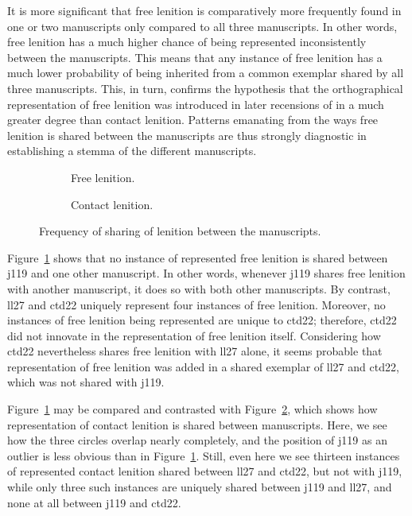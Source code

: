 It is more significant that free lenition is comparatively more frequently found in one or two manuscripts only compared to all three manuscripts. In other words, free lenition has a much higher chance of being represented inconsistently between the manuscripts. This means that any instance of free lenition has a much lower probability of being inherited from a common exemplar shared by all three manuscripts. This, in turn, confirms the hypothesis that the orthographical representation of free lenition was introduced in later recensions of  in a much greater degree than contact lenition. Patterns  emanating from the ways free lenition is shared between the manuscripts are thus strongly diagnostic in establishing a stemma of the different manuscripts.

\begin{figure}[h]
  \begin{subfigure}[b]{0.5\linewidth}
    \centering
    
    \caption{Free lenition.}
    \label{fig:vennfreelendewi}
  \end{subfigure}%
  \begin{subfigure}[b]{0.5\linewidth}
    \centering
    
    \caption{Contact lenition.}
    \label{fig:venncontlendewi}
  \end{subfigure}
  \caption{Frequency of sharing of lenition between  the manuscripts.}
  \label{fig:vennlendewi}
\end{figure}
Figure~\ref{fig:vennfreelendewi} shows that no instance of represented free lenition  is shared between \gls{j119} and one other manuscript. In other words, whenever \gls{j119} shares free lenition with another manuscript, it does so with both other manuscripts. By contrast, \gls{ll27} and \gls{ctd22} uniquely represent four instances of free lenition. Moreover, no instances of free lenition being represented are unique to \gls{ctd22}; therefore, \gls{ctd22} did not innovate in the representation of free lenition itself. Considering how \gls{ctd22} nevertheless shares free lenition with \gls{ll27} alone, it seems probable that representation of free lenition was added in a shared exemplar of \gls{ll27} and \gls{ctd22}, which was not shared with \gls{j119}.


Figure~\ref{fig:vennfreelendewi} may be compared and contrasted with Figure~\ref{fig:venncontlendewi}, which shows how representation of contact lenition is shared between manuscripts. Here, we see how the three circles overlap nearly completely, and the position of \gls{j119} as an outlier is less obvious than in Figure~\ref{fig:vennfreelendewi}. Still, even here we see thirteen instances of represented contact lenition shared between \gls{ll27} and \gls{ctd22}, but not with \gls{j119}, while only three such instances are uniquely  shared between \gls{j119} and \gls{ll27}, and none at all between \gls{j119} and \gls{ctd22}.

